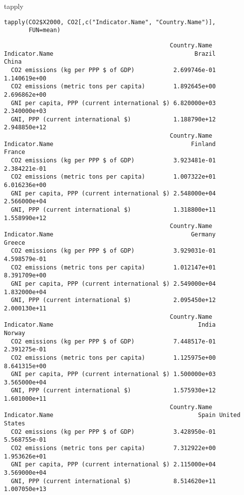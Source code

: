 \documentclass[xcolor={usenames,svgnames,dvipsnames}]{beamer}
\begin{document}
\begin{frame}[fragile,label=sec-3-5]{tapply}
 \lstset{language=R,numbers=none}
\begin{lstlisting}
tapply(CO2$X2000, CO2[,c("Indicator.Name", "Country.Name")],
       FUN=mean)
\end{lstlisting}

\begin{verbatim}
                                               Country.Name
Indicator.Name                                        Brazil        China
  CO2 emissions (kg per PPP $ of GDP)           2.699746e-01 1.140619e+00
  CO2 emissions (metric tons per capita)        1.892645e+00 2.696862e+00
  GNI per capita, PPP (current international $) 6.820000e+03 2.340000e+03
  GNI, PPP (current international $)            1.188790e+12 2.948850e+12
                                               Country.Name
Indicator.Name                                       Finland       France
  CO2 emissions (kg per PPP $ of GDP)           3.923481e-01 2.384221e-01
  CO2 emissions (metric tons per capita)        1.007322e+01 6.016236e+00
  GNI per capita, PPP (current international $) 2.548000e+04 2.566000e+04
  GNI, PPP (current international $)            1.318800e+11 1.558990e+12
                                               Country.Name
Indicator.Name                                       Germany       Greece
  CO2 emissions (kg per PPP $ of GDP)           3.929031e-01 4.598579e-01
  CO2 emissions (metric tons per capita)        1.012147e+01 8.391709e+00
  GNI per capita, PPP (current international $) 2.549000e+04 1.832000e+04
  GNI, PPP (current international $)            2.095450e+12 2.000130e+11
                                               Country.Name
Indicator.Name                                         India       Norway
  CO2 emissions (kg per PPP $ of GDP)           7.448517e-01 2.391275e-01
  CO2 emissions (metric tons per capita)        1.125975e+00 8.641315e+00
  GNI per capita, PPP (current international $) 1.500000e+03 3.565000e+04
  GNI, PPP (current international $)            1.575930e+12 1.601000e+11
                                               Country.Name
Indicator.Name                                         Spain United States
  CO2 emissions (kg per PPP $ of GDP)           3.428950e-01  5.568755e-01
  CO2 emissions (metric tons per capita)        7.312922e+00  1.953626e+01
  GNI per capita, PPP (current international $) 2.115000e+04  3.569000e+04
  GNI, PPP (current international $)            8.514620e+11  1.007050e+13
\end{verbatim}
\end{frame}
\end{document}
